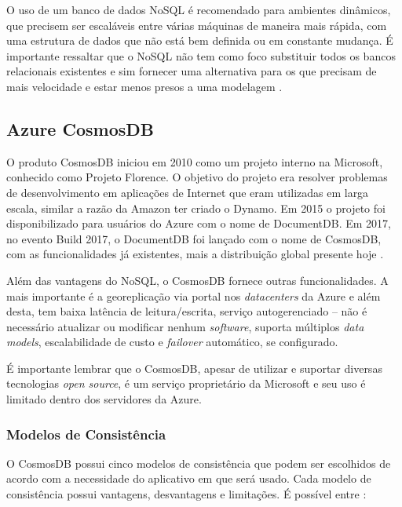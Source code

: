 \documentclass[12pt]{article}
\begin{document}
O uso de um banco de dados NoSQL é recomendado para ambientes dinâmicos, que precisem ser escaláveis entre várias máquinas de maneira mais rápida, com uma estrutura de dados que não está bem 
definida ou em constante mudança. É importante ressaltar que o NoSQL não tem como foco substituir todos os bancos relacionais existentes e sim fornecer uma alternativa para os que 
precisam de mais velocidade e estar menos presos a uma modelagem \cite{Oliveira2011} \cite{Lith2010} \cite{Leavitt2010}. 

\subsection{Azure CosmosDB}
O produto CosmosDB iniciou em 2010 como um projeto interno na Microsoft, conhecido como Projeto Florence. O objetivo do projeto era resolver problemas de desenvolvimento em aplicações de Internet
que eram utilizadas em larga escala, similar a razão da Amazon ter criado o Dynamo. Em 2015 o projeto foi disponibilizado para usuários do Azure com o nome de DocumentDB. Em 2017, no evento Build 2017,
o DocumentDB foi lançado com o nome de CosmosDB, com as funcionalidades já existentes, mais a distribuição global presente hoje \cite{Paz2018}.

Além das vantagens do NoSQL, o CosmosDB fornece outras funcionalidades. A mais importante é a georeplicação via portal nos \textit{datacenters} da Azure e além desta, tem baixa latência de leitura/escrita,
serviço autogerenciado -- não é necessário atualizar ou modificar nenhum \textit{software}, suporta múltiplos \textit{data models}, escalabilidade de custo e \textit{failover} automático, se configurado.

É importante lembrar que o CosmosDB, apesar de utilizar e suportar diversas tecnologias \textit{open source}, é um serviço proprietário da Microsoft e seu uso é limitado dentro dos 
servidores da Azure.

\subsubsection{Modelos de Consistência}
O CosmosDB possui cinco modelos de consistência que podem ser escolhidos de acordo com a necessidade do aplicativo em que será usado. Cada modelo de consistência possui vantagens, desvantagens e limitações.
É possível entre \cite{Paz2018}:
\end{document}
